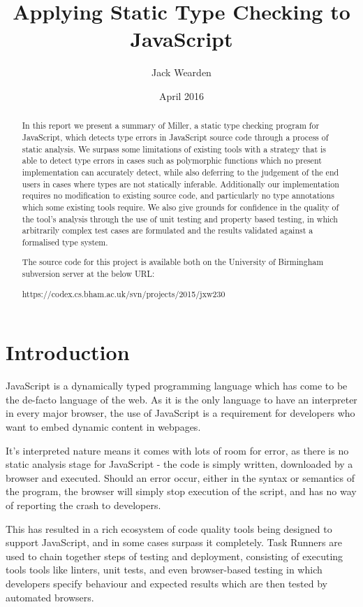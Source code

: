 \documentclass[british, twoside]{bhamthesis}
\title{Applying Static Type Checking to JavaScript}
\author{Jack Wearden}
\date{April 2016}  %
\theoremstyle{definition}
\begin{document}
\maketitle

\declaration

\begin{abstract}
  In this report we present a summary of Miller, a static type checking program for JavaScript, which detects type errors in JavaScript source code through a process of static analysis. We surpass some limitations of existing tools with a strategy that is able to detect type errors in cases such as polymorphic functions which no present implementation can accurately detect, while also deferring to the judgement of the end users in cases where types are not statically inferable. Additionally our implementation requires no modification to existing source code, and particularly no type annotations which some existing tools require. We also give grounds for confidence in the quality of the tool's analysis through the use of unit testing and property based testing, in which arbitrarily complex test cases are formulated and the results validated against a formalised type system.

  The source code for this project is available both on the University of Birmingham subversion server at the below URL:

    https://codex.cs.bham.ac.uk/svn/projects/2015/jxw230
\end{abstract}

\tableofcontents

\chapter{Introduction}

  JavaScript is a dynamically typed programming language which has come to be the de-facto language of the web. As it is the only language to have an interpreter in every major browser, the use of JavaScript is a requirement for developers who want to embed dynamic content in webpages.

  It's interpreted nature means it comes with lots of room for error, as there is no static analysis stage for JavaScript - the code is simply written, downloaded by a browser and executed. Should an error occur, either in the syntax or semantics of the program, the browser will simply stop execution of the script, and has no way of reporting the crash to developers.

  This has resulted in a rich ecosystem of code quality tools being designed to support JavaScript, and in some cases surpass it completely. Task Runners are used to chain together steps of testing and deployment, consisting of executing tools tools like linters, unit tests, and even browser-based testing in which developers specify behaviour and expected results which are then tested by automated browsers.
\end{document}
